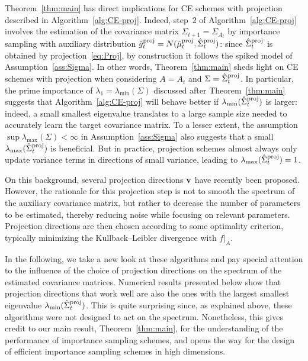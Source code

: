 \documentclass[]{article}
\newcommand{\proj}{{\textnormal{\textrm{proj}}}} %
\theoremstyle{plain}
\theoremstyle{definition}
\begin{document}
Theorem~\ref{thm:main} has direct implications for CE schemes with projection described in Algorithm~\ref{alg:CE-proj}. Indeed, step~2 of Algorithm~\ref{alg:CE-proj} involves the estimation of the covariance matrix $\Sigma_{t+1} = \Sigma_{A_t}$ by importance sampling with auxiliary distribution $\hat g^\proj_t = N(\hat \mu^\proj_t, \hat \Sigma^\proj_t)$: since $\hat \Sigma^\proj_t$ is obtained by projection~\eqref{eq:Proj}, by construction it follows the spiked model of Assumption~\ref{ass:Sigma}. In other words, Theorem~\ref{thm:main} sheds light on CE schemes with projection when considering $A = A_t$ and $\Sigma = \hat \Sigma^\proj_t$. In particular, the prime importance of $\lambda_1 = \lambda_{\min}(\Sigma)$ discussed after Theorem~\ref{thm:main} suggests that Algorithm~\ref{alg:CE-proj} will behave better if $\lambda_{\min}(\hat \Sigma^\proj_t)$ is larger: indeed, a small smallest eigenvalue translates to a large sample size needed to accurately learn the target covariance matrix. To a lesser extent, the assumption $\sup \lambda_{\max}(\Sigma) < \infty$ in Assumption~\ref{ass:Sigma} also suggests that a small $\lambda_{\max}(\hat \Sigma^\proj_t)$ is beneficial. But in practice, projection schemes almost always only update variance terms in directions of small variance, leading to $\lambda_{\max}(\hat \Sigma^\proj_t) = 1$.

On this background, several projection directions $\bf v$ have recently been proposed. However, the rationale for this projection step is not to smooth the spectrum of the auxiliary covariance matrix, but rather to decrease the number of parameters to be estimated, thereby reducing noise while focusing on relevant parameters. Projection directions are then chosen according to some optimality criterion, typically minimizing the Kullback--Leibler divergence with $f|_A$.

In the following, we take a new look at these algorithms and pay special attention to the influence of the choice of projection directions on the spectrum of the estimated covariance matrices. Numerical results presented below show that projection directions that work well are also the ones with the largest smallest eigenvalue $\lambda_{\min}(\hat \Sigma^\proj_t)$. This is quite surprising since, as explained above, these algorithms were not designed to act on the spectrum. Nonetheless, this gives credit to our main result, Theorem~\ref{thm:main}, for the understanding of the performance of importance sampling schemes, and opens the way for the design of efficient importance sampling schemes in high dimensions.
\end{document}
